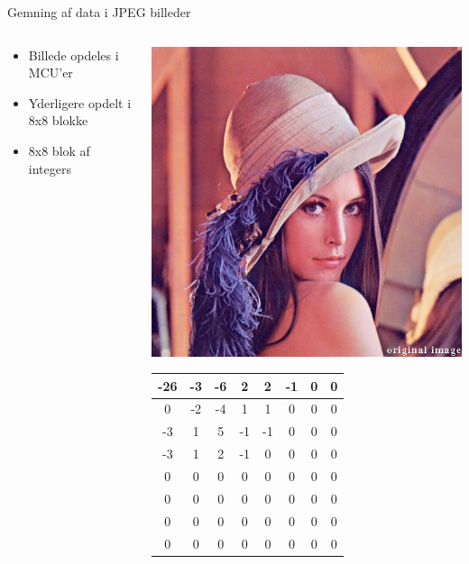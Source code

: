 \begin{frame}{Gemning af data i JPEG billeder}{}
	\begin{minipage}[0.5\textheight]{\textwidth}
		\begin{columns}[T]
			\begin{column}{0.5\textwidth}
				\vspace{.56mm}
				\begin{itemize}
					\item Billede opdeles i MCU'er
					\item Yderligere opdelt i 8x8 blokke
					\item 8x8 blok af integers
				\end{itemize}
			\end{column}
			\begin{column}{0.5\textwidth}
				\begin{center}
					\includegraphics[width=.5\textwidth]{figures/lena_color.jpg}
				\end{center}
				{\tiny \begin{table}[]
						\centering
						\begin{tabular}{|c|c|c|c|c|c|c|c|}
							\hline
							-26 & -3 & -6 & 2  & 2  & -1 & 0 & 0 \\ \hline
							0   & -2 & -4 & 1  & 1  & 0  & 0 & 0 \\ \hline
							-3  & 1  & 5  & -1 & -1 & 0  & 0 & 0 \\ \hline
							-3  & 1  & 2  & -1 & 0  & 0  & 0 & 0 \\ \hline
							0   & 0  & 0  & 0  & 0  & 0  & 0 & 0 \\ \hline
							0   & 0  & 0  & 0  & 0  & 0  & 0 & 0 \\ \hline
							0   & 0  & 0  & 0  & 0  & 0  & 0 & 0 \\ \hline
							0   & 0  & 0  & 0  & 0  & 0  & 0 & 0 \\ \hline

\end{tabular}
\end{table}}
\end{column}
\end{columns}
\end{minipage}
\end{frame}
